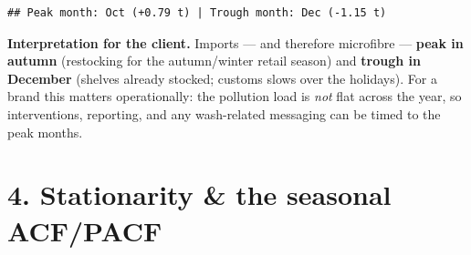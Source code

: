 \documentclass[
]{article}
\newenvironment{Shaded}{\begin{snugshade}}{\end{snugshade}}
\newcommand{\AttributeTok}[1]{\textcolor[rgb]{0.13,0.29,0.53}{#1}}
\newcommand{\ControlFlowTok}[1]{\textcolor[rgb]{0.13,0.29,0.53}{\textbf{#1}}}
\newcommand{\DecValTok}[1]{\textcolor[rgb]{0.00,0.00,0.81}{#1}}
\newcommand{\FunctionTok}[1]{\textcolor[rgb]{0.13,0.29,0.53}{\textbf{#1}}}
\newcommand{\NormalTok}[1]{#1}
\newcommand{\OtherTok}[1]{\textcolor[rgb]{0.56,0.35,0.01}{#1}}
\newcommand{\SpecialCharTok}[1]{\textcolor[rgb]{0.81,0.36,0.00}{\textbf{#1}}}
\newcommand{\StringTok}[1]{\textcolor[rgb]{0.31,0.60,0.02}{#1}}
\begin{document}
\begin{verbatim}
## Peak month: Oct (+0.79 t) | Trough month: Dec (-1.15 t)
\end{verbatim}

\textbf{Interpretation for the client.} Imports --- and therefore
microfibre --- \textbf{peak in autumn} (restocking for the autumn/winter
retail season) and \textbf{trough in December} (shelves already stocked;
customs slows over the holidays). For a brand this matters
operationally: the pollution load is \emph{not} flat across the year, so
interventions, reporting, and any wash-related messaging can be timed to
the peak months.

\section{4. Stationarity \& the seasonal
ACF/PACF}\label{stationarity-the-seasonal-acfpacf}

\begin{Shaded}
\end{Shaded}
\end{document}
